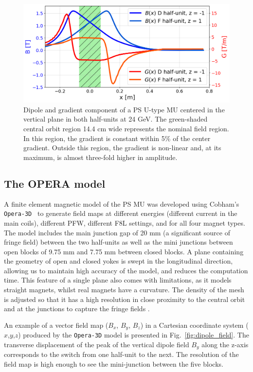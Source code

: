 \documentclass[a4paper,
               biblatex,     %
               keeplastbox,   %
               ]{jacow}
\begin{document}
\begin{figure}[!htb]
   \centering
   \includegraphics*[width=1.0\columnwidth, trim={0 0 0 0cm},clip]{Main_field_B_G_with_mask.png}
   \caption{Dipole and gradient component of a  PS U-type MU centered in the vertical plane in both half-units at 24 GeV. The green-shaded central orbit region 14.4 cm wide represents the nominal field region. In this region, the gradient is constant within 5\% of the center gradient. Outside this region, the gradient is non-linear and, at its maximum, is almost three-fold higher in amplitude.}
   \label{fig:gradient_field}
\end{figure}

\subsection{The OPERA model}
A finite element magnetic model of the PS MU was developed using Cobham's \texttt{Opera-3D}~\cite{noauthor_opera_nodate, anglada_pxmu_hrcwp_nodate} to generate field maps at different energies (different current in the main coils), different PFW, different F8L settings, and for all four magnet types. The model includes the main junction gap of 20 mm (a significant source of fringe field) between the two half-units as well as the mini junctions between open blocks of 9.75 mm and 7.75 mm between closed blocks. A plane containing the geometry of open and closed yokes is swept in the longitudinal direction, allowing us to maintain high accuracy of the model, and reduces the computation time. This feature of a single plane also comes with limitations, as it models straight magnets, whilst real magnets have a curvature. The density of the mesh is adjusted so that it has a high resolution in close proximity to the central orbit and at the junctions to capture the fringe fields \cite{anglada_reference_2019}.

An example of a vector field map ($B_x$, $B_y$, $B_z$) in a Cartesian coordinate system ($x$,$y$,$z$) produced by the \texttt{Opera-3D} model is presented in Fig.~\ref{fig:dipole_field}. The transverse displacement of the peak of the vertical dipole field $B_{y}$ along the z-axis corresponds to the switch from one half-unit to the next. The resolution of the field map is high enough to see the mini-junction between the five blocks.
\end{document}

